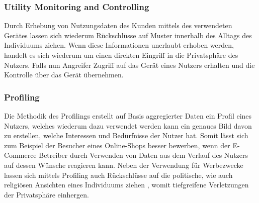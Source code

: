 \subsubsection{Utility Monitoring and Controlling}
\label{sec:Grundlagen:ssec:Gefahren für die Privatsphäre:sssec:Monitoring}

Durch Erhebung von Nutzungsdaten des Kunden mittels des verwendeten Gerätes lassen sich wiederum Rückschlüsse auf Muster innerhalb des Alltags des Individuums ziehen. Wenn diese Informationen unerlaubt erhoben werden, handelt es sich wiederum um einen direkten Eingriff in die Privatsphäre des Nutzers. Falls nun Angreifer Zugriff auf das Gerät eines Nutzers erhalten und die Kontrolle über das Gerät übernehmen.

\subsubsection{Profiling}
\label{sec:Grundlagen:ssec:Gefahren für die Privatsphäre:sssec:Profiling}

Die Methodik des Profilings erstellt auf Basis aggregierter Daten ein Profil eines Nutzers, welches wiederum dazu verwendet werden kann ein genaues Bild davon zu erstellen, welche Interessen und Bedürfnisse der Nutzer hat. Somit lässt sich zum Beispiel der Besucher eines Online-Shops besser bewerben, wenn der E-Commerce Betreiber durch Verwenden von Daten aus dem Verlauf des Nutzers auf dessen Wünsche reagieren kann. Neben der Verwendung für Werbezwecke lassen sich mittels Profiling auch Rückschlüsse auf die politische, wie auch religiösen Ansichten eines Individuums ziehen \cite{Seliem2018}, womit tiefgreifene Verletzungen der Privatsphäre einhergen.

